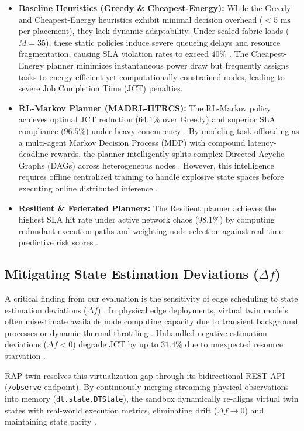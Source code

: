 \documentclass[twoside,twocolumn,10pt]{article}
\begin{document}
\begin{itemize}
    \item \textbf{Baseline Heuristics (Greedy \& Cheapest-Energy):} While the Greedy and Cheapest-Energy heuristics exhibit minimal decision overhead ($<5\text{ ms}$ per placement), they lack dynamic adaptability. Under scaled fabric loads ($M=35$), these static policies induce severe queueing delays and resource fragmentation, causing SLA violation rates to exceed $40\%$ \cite{dai2024}. The Cheapest-Energy planner minimizes instantaneous power draw but frequently assigns tasks to energy-efficient yet computationally constrained nodes, leading to severe Job Completion Time (JCT) penalties.
    \item \textbf{RL-Markov Planner (MADRL-HTRCS):} The RL-Markov policy achieves optimal JCT reduction ($64.1\%$ over Greedy) and superior SLA compliance ($96.5\%$) under heavy concurrency \cite{xu2023, sai2024}. By modeling task offloading as a multi-agent Markov Decision Process (MDP) with compound latency-deadline rewards, the planner intelligently splits complex Directed Acyclic Graphs (DAGs) across heterogeneous nodes \cite{sai2024, dai2024}. However, this intelligence requires offline centralized training to handle explosive state spaces before executing online distributed inference \cite{dai2024, sai2024}.
    \item \textbf{Resilient \& Federated Planners:} The Resilient planner achieves the highest SLA hit rate under active network chaos ($98.1\%$) by computing redundant execution paths and weighting node selection against real-time predictive risk scores \cite{dai2024}.
\end{itemize}

\subsection{Mitigating State Estimation Deviations ($\Delta f$)}
A critical finding from our evaluation is the sensitivity of edge scheduling to state estimation deviations ($\Delta f$) \cite{xu2023, dai2024}. In physical edge deployments, virtual twin models often misestimate available node computing capacity due to transient background processes or dynamic thermal throttling \cite{kim2022, tran2025}. Unhandled negative estimation deviations ($\Delta f < 0$) degrade JCT by up to $31.4\%$ due to unexpected resource starvation \cite{xu2023}.

RAP twin resolves this virtualization gap through its bidirectional REST API (\texttt{/observe} endpoint). By continuously merging streaming physical observations into memory (\texttt{dt.state.DTState}), the sandbox dynamically re-aligns virtual twin states with real-world execution metrics, eliminating drift ($\Delta f \to 0$) and maintaining state parity \cite{dai2024}.
\end{document}
